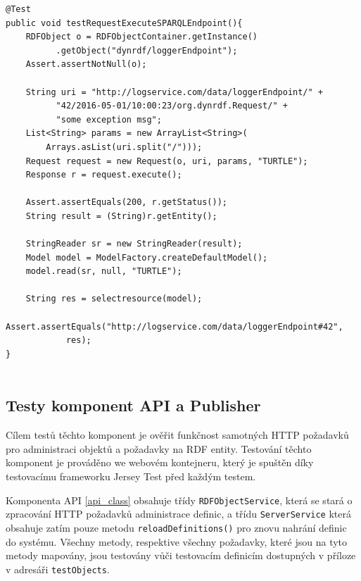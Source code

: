 \documentclass[thesis=B,czech]{FITthesis}[2012/06/26]
\begin{document}
  \begin{lstlisting}[float=htb,caption={Test metody executeSPARQLEndpoint()},label=list:test_execute_endpoint]
@Test
public void testRequestExecuteSPARQLEndpoint(){
    RDFObject o = RDFObjectContainer.getInstance()
		  .getObject("dynrdf/loggerEndpoint");
    Assert.assertNotNull(o);

    String uri = "http://logservice.com/data/loggerEndpoint/" + 
		  "42/2016-05-01/10:00:23/org.dynrdf.Request/" +
		  "some exception msg";
    List<String> params = new ArrayList<String>(
	    Arrays.asList(uri.split("/")));
    Request request = new Request(o, uri, params, "TURTLE");
    Response r = request.execute();

    Assert.assertEquals(200, r.getStatus());
    String result = (String)r.getEntity();

    StringReader sr = new StringReader(result);
    Model model = ModelFactory.createDefaultModel();
    model.read(sr, null, "TURTLE");

    String res = selectresource(model);
    Assert.assertEquals("http://logservice.com/data/loggerEndpoint#42",
			res);
}
    
\end{lstlisting}

\subsection{Testy komponent API a Publisher}
Cílem testů těchto komponent je ověřit funkčnost samotných HTTP požadavků pro administraci objektů a požadavky na RDF entity.
Testování těchto komponent je prováděno we webovém kontejneru, který je spuštěn díky
testovacímu frameworku Jersey Test \cite{jersey_test} před každým testem.

Komponenta API \ref{api_class} obsahuje třídy \texttt{RDFObjectService}, která se stará o zpracování HTTP požadavků administrace definic,
a třídu \texttt{ServerService} která obsahuje zatím pouze metodu \texttt{reloadDefinitions()} pro znovu nahrání definic do systému.
Všechny metody, respektive všechny požadavky, které jsou na tyto metody mapovány, jsou testovány vůči testovacím definicím dostupných v příloze
v adresáři \texttt{testObjects}. 
\end{document}
